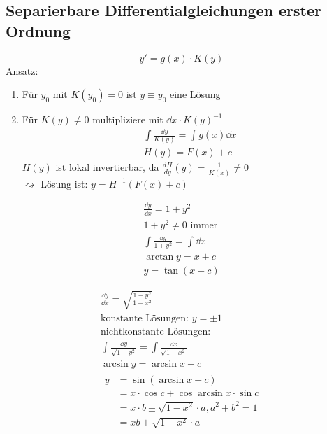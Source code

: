 \subsection{Separierbare Differentialgleichungen erster Ordnung}
\[ y' = g(x) \cdot K(y) \]
Ansatz:
\begin{enumerate}[label=(\alph*)]
	\item Für $y_0$ mit $K(y_0) = 0$ ist $y \equiv y_0$ eine Lösung
	\item Für $K(y) \neq 0$ multipliziere mit $\dd x \cdot K(y)^{-1}$
		\begin{gather*}
			\int \frac{\dd y}{K(y)} = \int g(x) \dd x \\
			H(y) = F(x) + c
		\end{gather*}
		$H(y)$ ist lokal invertierbar, da $\frac{dH}{dy}(y) = \frac{1}{K(x)} \neq 0$ \\
		$\rightsquigarrow$ Lösung ist: $y = H^{-1}(F(x) + c)$
\end{enumerate}

\begin{bsp*}
	\begin{gather*}
		\frac{\dd y}{\dd x} = 1 + y^2 \\
		1 + y^2 \neq 0 \text{ immer} \\
		\int \frac{\dd y}{1+y^2} = \int \dd x \\
		\arctan y = x + c \\
		y = \tan(x+c)
	\end{gather*}
\end{bsp*}
\begin{bsp*}
	\begin{gather*}
		\frac{\dd y}{\dd x} = \sqrt{\frac{1-y^2}{1-x^2}} \\
		\text{konstante Lösungen: } y = \pm 1 \\
		\text{nichtkonstante Lösungen:} \\
		\int \frac{\dd y}{\sqrt{1-y^2}} = \int \frac{\dd x}{\sqrt{1-x^2}} \\
		\arcsin y = \arcsin x + c \\
		\begin{split}
			y	&= \sin( \arcsin x + c) \\
				&= x \cdot \cos c + \cos \arcsin x \cdot \sin c \\
				&= x \cdot b \pm \sqrt{1-x^2} \cdot a , a^2 + b^2 = 1 \\
				&= xb + \sqrt{1-x^2} \cdot a
		\end{split}
	\end{gather*}
\end{bsp*}

